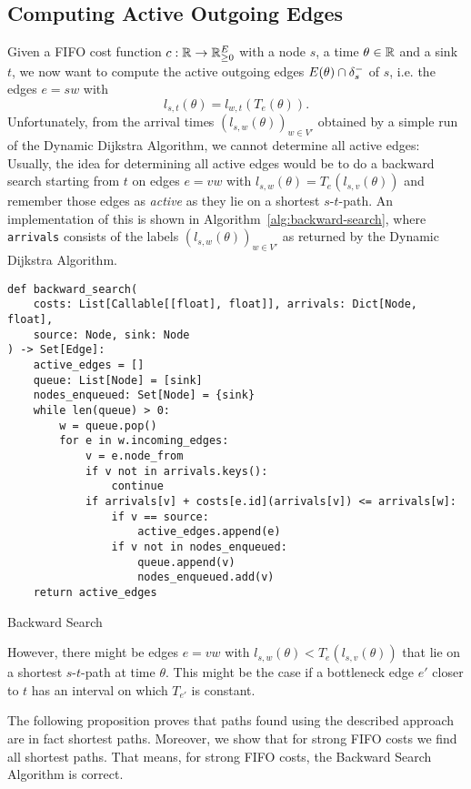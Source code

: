 \subsection{Computing Active Outgoing Edges}

Given a FIFO cost function $c: \mathbb{R}\rightarrow\mathbb{R}_{\geq0}^E$ with a node $s$, a time $\theta\in\mathbb{R}$ and a sink $t$, we now want to compute the active outgoing edges $E(\theta) \cap \delta^-_{s}$ of $s$, i.e. the edges $e=sw$ with 
\[
    l_{s,t}(\theta) = l_{w,t}(T_e(\theta)).
\]
Unfortunately, from the arrival times $(l_{s,w}(\theta))_{w\in V'}$ obtained by a simple run of the Dynamic Dijkstra Algorithm, we cannot determine all active edges:
Usually, the idea for determining all active edges would be to do a backward search starting from $t$ on edges $e=vw$ with $l_{s,w}(\theta) = T_e(l_{s,v}(\theta))$ and remember those edges as \emph{active} as they lie on a shortest $s$-$t$-path.
An implementation of this is shown in Algorithm~\ref{alg:backward-search}, where \texttt{arrivals} consists of the labels $(l_{s,w}(\theta))_{w\in V'}$ as returned by the Dynamic Dijkstra Algorithm.

\begin{algorithm}
    \begin{verbatim}
def backward_search(
    costs: List[Callable[[float], float]], arrivals: Dict[Node, float],
    source: Node, sink: Node
) -> Set[Edge]:
    active_edges = []
    queue: List[Node] = [sink]
    nodes_enqueued: Set[Node] = {sink}
    while len(queue) > 0:
        w = queue.pop()
        for e in w.incoming_edges:
            v = e.node_from
            if v not in arrivals.keys():
                continue
            if arrivals[v] + costs[e.id](arrivals[v]) <= arrivals[w]:
                if v == source:
                    active_edges.append(e)
                if v not in nodes_enqueued:
                    queue.append(v)
                    nodes_enqueued.add(v)
    return active_edges
    \end{verbatim}
    \caption{Backward Search}
    \label{alg:backward-search}
\end{algorithm}

However, there might be edges $e=vw$ with $l_{s,w}(\theta) < T_e(l_{s,v}(\theta))$ that lie on a shortest $s$-$t$-path at time $\theta$.
This might be the case if a bottleneck edge $e'$ closer to $t$ has an interval on which $T_{e'}$ is constant.

The following proposition proves that paths found using the described approach are in fact shortest paths.
Moreover, we show that for strong FIFO costs we find all shortest paths.
That means, for strong FIFO costs, the Backward Search Algorithm is correct.

